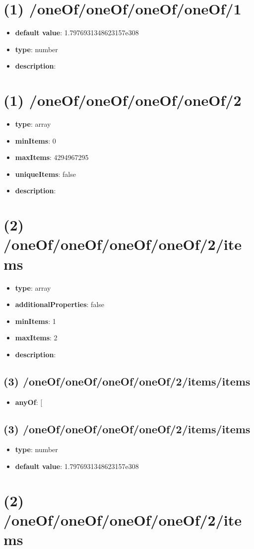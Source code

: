 \section{(1) /oneOf/oneOf/oneOf/oneOf/1}
\begin{itemize}[leftmargin=1em]\item {\bf default value}: 1.7976931348623157e308
\item {\bf type}: number
\item {\bf description}: 
\end{itemize}\section{(1) /oneOf/oneOf/oneOf/oneOf/2}
\begin{itemize}[leftmargin=1em]\item {\bf type}: array
\item {\bf minItems}: 0
\item {\bf maxItems}: 4294967295
\item {\bf uniqueItems}: false
\item {\bf description}: 
\end{itemize}\section{(2) /oneOf/oneOf/oneOf/oneOf/2/items}
\begin{itemize}[leftmargin=2em]\item {\bf type}: array
\item {\bf additionalProperties}: false
\item {\bf minItems}: 1
\item {\bf maxItems}: 2
\item {\bf description}: 
\end{itemize}\subsection{(3) /oneOf/oneOf/oneOf/oneOf/2/items/items}
\begin{itemize}[leftmargin=3em]\item {\bf anyOf}: [\end{itemize}\subsection{(3) /oneOf/oneOf/oneOf/oneOf/2/items/items}
\begin{itemize}[leftmargin=3em]\item {\bf type}: number\item {\bf default value}: 1.7976931348623157e308
\end{itemize}\section{(2) /oneOf/oneOf/oneOf/oneOf/2/items}
